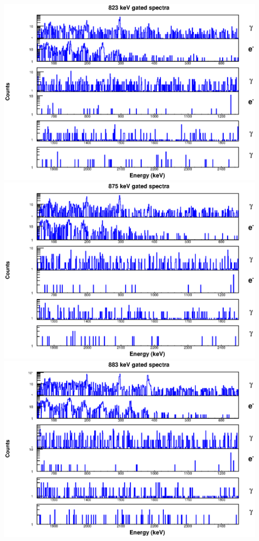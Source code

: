 \includegraphics[scale=0.8]{156Gd_Appendix/823_combined.eps}
\includegraphics[scale=0.8]{156Gd_Appendix/875_combined.eps}
\includegraphics[scale=0.8]{156Gd_Appendix/883_combined.eps}

